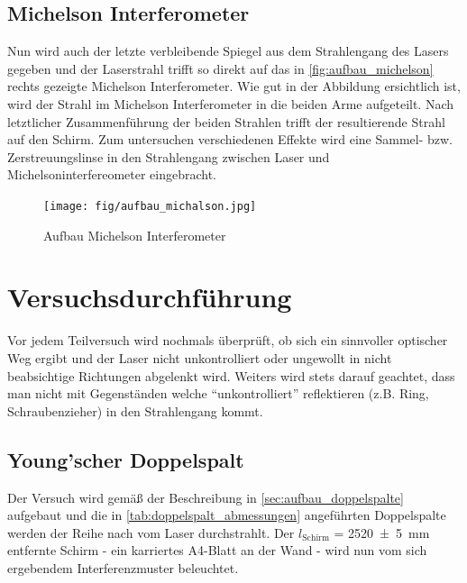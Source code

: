\documentclass[ngerman]{scrartcl}
\begin{document}
\subsection{Michelson Interferometer}
\label{sec:aufbau_michelson}
Nun wird auch der letzte verbleibende Spiegel aus dem Strahlengang des Lasers gegeben und der Laserstrahl trifft so direkt auf das in \autoref{fig:aufbau_michelson} rechts gezeigte Michelson Interferometer. Wie gut in der Abbildung ersichtlich ist, wird der Strahl im Michelson Interferometer in die beiden Arme aufgeteilt. Nach letztlicher Zusammenführung der beiden Strahlen trifft der resultierende Strahl auf den Schirm. 
Zum untersuchen verschiedenen Effekte wird eine Sammel- bzw. Zerstreuungslinse in den Strahlengang zwischen Laser und Michelsoninterfereometer eingebracht. 
\begin{figure}[H]
    \centering
    \begin{samepage}
        \texttt{[image: fig/aufbau\_michalson.jpg]}
        \caption{Aufbau Michelson Interferometer}
        \label{fig:aufbau_michelson}
    \end{samepage}
\end{figure}


\section{Versuchsdurchführung}
\label{sec:durchfuehrung}
Vor jedem Teilversuch wird nochmals überprüft, ob sich ein sinnvoller optischer Weg ergibt und der Laser nicht unkontrolliert oder ungewollt in nicht beabsichtige Richtungen abgelenkt wird. Weiters wird stets darauf geachtet, dass man nicht mit Gegenständen welche \enquote{unkontrolliert} reflektieren (z.B. Ring, Schraubenzieher) in den Strahlengang kommt. 
\subsection{Young'scher Doppelspalt}
\label{sec:durchfuehrung_doppelspalt}
Der Versuch wird gemäß der Beschreibung in \autoref{sec:aufbau_doppelspalte} aufgebaut und die in \autoref{tab:doppelspalt_abmessungen} angeführten Doppelspalte werden der Reihe nach vom Laser durchstrahlt. Der $l_\text{Schirm}$ = \SI{2520(5)}{\milli\meter} entfernte Schirm - ein karriertes A4-Blatt an der Wand - wird nun vom sich ergebendem Interferenzmuster beleuchtet. 
\end{document}
